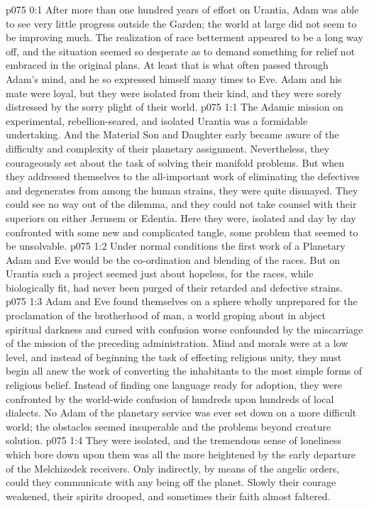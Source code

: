 \author{Solonia}
\vs p075 0:1 After more than one hundred years of effort on Urantia, Adam was able to see very little progress outside the Garden; the world at large did not seem to be improving much. The realization of race betterment appeared to be a long way off, and the situation seemed so desperate as to demand something for relief not embraced in the original plans. At least that is what often passed through Adam’s mind, and he so expressed himself many times to Eve. Adam and his mate were loyal, but they were isolated from their kind, and they were sorely distressed by the sorry plight of their world.
\vs p075 1:1 The Adamic mission on experimental, rebellion\hyp{}seared, and isolated Urantia was a formidable undertaking. And the Material Son and Daughter early became aware of the difficulty and complexity of their planetary assignment. Nevertheless, they courageously set about the task of solving their manifold problems. But when they addressed themselves to the all\hyp{}important work of eliminating the defectives and degenerates from among the human strains, they were quite dismayed. They could see no way out of the dilemma, and they could not take counsel with their superiors on either Jerusem or Edentia. Here they were, isolated and day by day confronted with some new and complicated tangle, some problem that seemed to be unsolvable.
\vs p075 1:2 Under normal conditions the first work of a Planetary Adam and Eve would be the co\hyp{}ordination and blending of the races. But on Urantia such a project seemed just about hopeless, for the races, while biologically fit, had never been purged of their retarded and defective strains.
\vs p075 1:3 Adam and Eve found themselves on a sphere wholly unprepared for the proclamation of the brotherhood of man, a world groping about in abject spiritual darkness and cursed with confusion worse confounded by the miscarriage of the mission of the preceding administration. Mind and morals were at a low level, and instead of beginning the task of effecting religious unity, they must begin all anew the work of converting the inhabitants to the most simple forms of religious belief. Instead of finding one language ready for adoption, they were confronted by the world\hyp{}wide confusion of hundreds upon hundreds of local dialects. No Adam of the planetary service was ever set down on a more difficult world; the obstacles seemed insuperable and the problems beyond creature solution.
\vs p075 1:4 They were isolated, and the tremendous sense of loneliness which bore down upon them was all the more heightened by the early departure of the Melchizedek receivers. Only indirectly, by means of the angelic orders, could they communicate with any being off the planet. Slowly their courage weakened, their spirits drooped, and sometimes their faith almost faltered.
